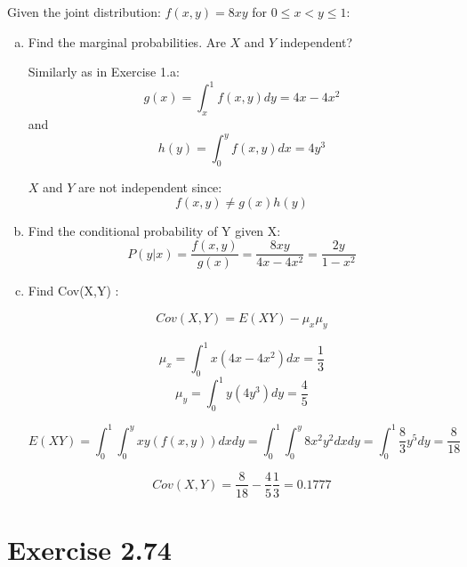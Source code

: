 \documentclass[10pt]{article}
\begin{document}
Given the joint distribution: $ f(x,y) = 8xy $ for $0\leq x < y \leq 1$: 

\begin{enumerate}[a.]
    \item Find the marginal probabilities. Are $X$ and $Y$ independent?  

          Similarly as in Exercise 1.a:
          \[
          g(x) = \int_x^1 f(x,y) dy = 4x - 4x^2 
          \]
          and
          \[
          h(y) = \int_0^y f(x,y) dx = 4y^3
          \]

          $X$ and $Y$ are not independent since:
          \[
          f(x,y) \neq g(x)h(y)
          \]

    \item Find the conditional probability of Y given X:
        \[
          P (y|x) =\frac{f(x,y)}{g(x)} = \frac{8xy}{4x-4x^2} = \frac{2y}{1-x^2}
        \]
    
    \item Find Cov(X,Y) :

        \[
         Cov (X,Y) = E(XY) -\mu_x \mu_y 
        \]

        \[
        \mu_x = \int_0^1 x(4x-4x^2) dx = \frac{1}{3} 
        \]
        \[
        \mu_y = \int_0^1 y(4y^3) dy = \frac{4}{5} 
        \]


        \[
          E(XY) = \int_0^1 \int_0^y xy(f(x,y))dxdy = \int_0^1 \int_0^y 8x^2y^2 dxdy = \int_0^1 \frac{8}{3}y^5 dy = \frac{8}{18}
        \]

        \[
          Cov(X,Y) = \frac{8}{18} - \frac{4}{5}\frac{1}{3} =0.1777
        \]

\end{enumerate}



\section{Exercise 2.74}
  
\end{document}
